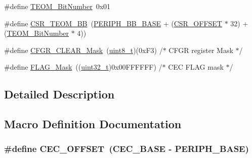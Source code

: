\begin{DoxyCompactItemize}
\item 
\#define \hyperlink{group___c_e_c___private___defines_gac86378eff7728e5cfca5480ab2dbef0b}{T\+E\+O\+M\+\_\+\+Bit\+Number}~0x01
\item 
\#define \hyperlink{group___c_e_c___private___defines_ga9ac493d98ce1f6d82b778ace0f2bc7bb}{C\+S\+R\+\_\+\+T\+E\+O\+M\+\_\+\+BB}~(\hyperlink{openmotestm_2library_2inc_2stm32f10x__map_8h_aed7efc100877000845c236ccdc9e144a}{P\+E\+R\+I\+P\+H\+\_\+\+B\+B\+\_\+\+B\+A\+SE} + (\hyperlink{openmotestm_2library_2src_2stm32f10x__rcc_8c_a984cbe73312b6d3d355c5053763d499a}{C\+S\+R\+\_\+\+O\+F\+F\+S\+ET} $\ast$ 32) + (\hyperlink{group___c_e_c___private___defines_gac86378eff7728e5cfca5480ab2dbef0b}{T\+E\+O\+M\+\_\+\+Bit\+Number} $\ast$ 4))
\item 
\#define \hyperlink{group___c_e_c___private___defines_gaaedf9b8df17534f5eaf75ec1ca3fbd7a}{C\+F\+G\+R\+\_\+\+C\+L\+E\+A\+R\+\_\+\+Mask}~(\hyperlink{_p_e___types_8h_aba7bc1797add20fe3efdf37ced1182c5}{uint8\+\_\+t})(0x\+F3)        /$\ast$ C\+F\+G\+R register Mask $\ast$/
\item 
\#define \hyperlink{group___c_e_c___private___defines_ga2be62bf481cd44de9ab604efe5595ff6}{F\+L\+A\+G\+\_\+\+Mask}~((\hyperlink{_p_e___types_8h_a33594304e786b158f3fb30289278f5af}{uint32\+\_\+t})0x00\+F\+F\+F\+F\+F\+F) /$\ast$ C\+E\+C F\+L\+A\+G mask $\ast$/
\end{DoxyCompactItemize}


\subsection{Detailed Description}


\subsection{Macro Definition Documentation}
\subsubsection[{\texorpdfstring{C\+E\+C\+\_\+\+O\+F\+F\+S\+ET}{CEC_OFFSET}}]{\setlength{\rightskip}{0pt plus 5cm}\#define C\+E\+C\+\_\+\+O\+F\+F\+S\+ET~({\bf C\+E\+C\+\_\+\+B\+A\+SE} -\/ {\bf P\+E\+R\+I\+P\+H\+\_\+\+B\+A\+SE})}\hypertarget{group___c_e_c___private___defines_ga675324bd8967b75f32554f50210821af}{}\label{group___c_e_c___private___defines_ga675324bd8967b75f32554f50210821af}


